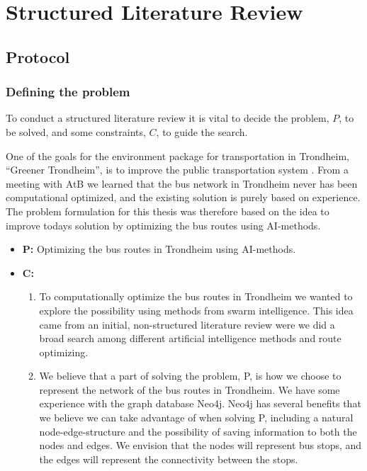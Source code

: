 \chapter{Structured Literature Review}

\label{appendixA}
\section{Protocol}

\subsection{Defining the problem}
\label{sec:researchQSLR}
To conduct a structured literature review it is vital to decide the problem, $P$, to be solved, and some constraints, $C$, to guide the search.

One of the goals for the environment package for transportation in Trondheim, ``Greener Trondheim'', is to improve the public transportation system \citep{website:miljopakken}. From a meeting with AtB \citep{website:atb} we learned that the bus network in Trondheim never has been computational optimized, and the existing solution is purely based on experience. The problem formulation for this thesis was therefore based on the idea to improve todays solution by optimizing the bus routes using AI-methods. 

\begin{itemize}
\item \textbf{P:} Optimizing the bus routes in Trondheim using AI-methods. %
\item \textbf{C:} 
    \begin{enumerate}
        \item To computationally optimize the bus routes in Trondheim we wanted to explore the possibility using methods from swarm intelligence. This idea came from an initial, non-structured literature review were we did a broad search among different artificial intelligence methods and route optimizing. %
        \item We believe that a part of solving the problem, P, is how we choose to represent the network of the bus routes in Trondheim. We have some experience with the graph database Neo4j. Neo4j has several benefits that we believe we can take advantage of when solving P, including a natural node-edge-structure and the possibility of saving information to both the nodes and edges. We envision that the nodes will represent bus stops, and the edges will represent the connectivity between the stops. 
    \end{enumerate}
\end{itemize}

